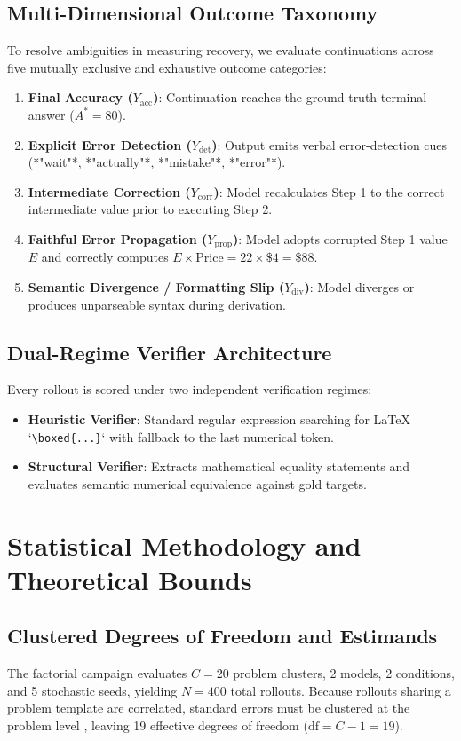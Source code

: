 \documentclass[11pt,letterpaper]{article}
\begin{document}
\subsection{Multi-Dimensional Outcome Taxonomy}
To resolve ambiguities in measuring recovery, we evaluate continuations across five mutually exclusive and exhaustive outcome categories:
\begin{enumerate}
    \item \textbf{Final Accuracy ($Y_{\text{acc}}$)}: Continuation reaches the ground-truth terminal answer ($A^* = 80$).
    \item \textbf{Explicit Error Detection ($Y_{\text{det}}$)}: Output emits verbal error-detection cues (*"wait"*, *"actually"*, *"mistake"*, *"error"*).
    \item \textbf{Intermediate Correction ($Y_{\text{corr}}$)}: Model recalculates Step 1 to the correct intermediate value prior to executing Step 2.
    \item \textbf{Faithful Error Propagation ($Y_{\text{prop}}$)}: Model adopts corrupted Step 1 value $E$ and correctly computes $E \times \text{Price} = 22 \times \$4 = \$88$.
    \item \textbf{Semantic Divergence / Formatting Slip ($Y_{\text{div}}$)}: Model diverges or produces unparseable syntax during derivation.
\end{enumerate}

\subsection{Dual-Regime Verifier Architecture}
Every rollout is scored under two independent verification regimes:
\begin{itemize}
    \item \textbf{Heuristic Verifier}: Standard regular expression searching for LaTeX `\texttt{\textbackslash boxed\{...\}}` with fallback to the last numerical token.
    \item \textbf{Structural Verifier}: Extracts mathematical equality statements and evaluates semantic numerical equivalence against gold targets.
\end{itemize}

\section{Statistical Methodology and Theoretical Bounds}

\subsection{Clustered Degrees of Freedom and Estimands}
The factorial campaign evaluates $C=20$ problem clusters, 2 models, 2 conditions, and 5 stochastic seeds, yielding $N=400$ total rollouts. Because rollouts sharing a problem template are correlated, standard errors must be clustered at the problem level \cite{cameron2015practitioner}, leaving 19 effective degrees of freedom ($\text{df} = C - 1 = 19$).
\end{document}
